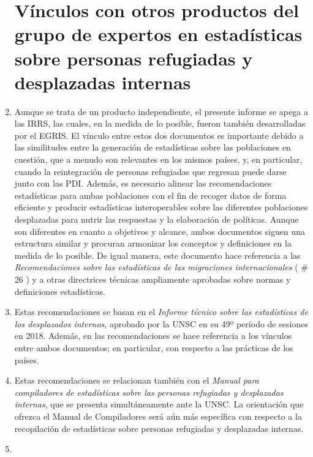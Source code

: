 \documentclass[
]{book}
\begin{document}
\begin{enumerate}
{  \section{Vínculos con otros productos del grupo de expertos en estadísticas sobre personas refugiadas y desplazadas internas}\label{vuxednculos-con-otros-productos-del-grupo-de-expertos-en-estaduxedsticas-sobre-personas-refugiadas-y-desplazadas-internas}}
\item
  Aunque se trata de un producto independiente, el presente informe se apega a las IRRS, las cuales, en la medida de lo posible, fueron también desarrolladas por el EGRIS. El vínculo entre estos dos documentos es importante debido a las similitudes entre la generación de estadísticas sobre las poblaciones en cuestión, que a menudo son relevantes en los mismos países, y, en particular, cuando la reintegración de personas refugiadas que regresan puede darse junto con las PDI. Además, es necesario alinear las recomendaciones estadísticas para ambas poblaciones con el fin de recoger datos de forma eficiente y producir estadísticas interoperables sobre las diferentes poblaciones desplazadas para nutrir las respuestas y la elaboración de políticas. Aunque son diferentes en cuanto a objetivos y alcance, ambos documentos siguen una estructura similar y procuran armonizar los conceptos y definiciones en la medida de lo posible. De igual manera, este documento hace referencia a las \emph{Recomendaciones sobre las estadísticas de las migraciones internacionales} (
  \# 26
  ) y a otras directrices técnicas ampliamente aprobadas sobre normas y definiciones estadísticas.
\item
  Estas recomendaciones se basan en el \emph{Informe técnico sobre las estadísticas de los desplazados internos}, aprobado por la UNSC en su 49º período de sesiones en 2018. Además, en las recomendaciones se hace referencia a los vínculos entre ambos documentos; en particular, con respecto a las prácticas de los países.
\item
  Estas recomendaciones se relacionan también con el \emph{Manual para compiladores de estadísticas sobre las personas refugiadas y desplazadas internas}, que se presenta simultáneamente ante la UNSC. La orientación que ofrezca el Manual de Compiladores será aún más específica con respecto a la recopilación de estadísticas sobre personas refugiadas y desplazadas internas.
\item ~
  \hypertarget{disposiciuxf3n-de-las-recomendaciones}{%
}
\end{enumerate}
\end{document}
